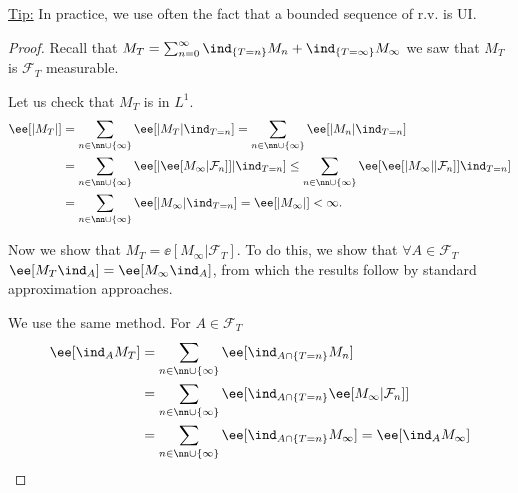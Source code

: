 \documentclass[../main.tex]{subfiles}
\begin{document}
\underline{Tip:} In practice, we use often the fact that a bounded sequence of
r.v. is UI.

\begin{proof}
    Recall that $M_T = \sum_{n = 0}^\infty \ind_{\{ T = n \}} M_n + \ind_{\{ T =
    \infty\} } M_{\infty}$ we saw that $M_T$ is $\mathcal{F}_T$ measurable. 

    Let us check that $M_T$ is in $L^1$.
    \begin{align*}
      \ee[|M_T|] &= \sum_{n \in \nn \cup \{ \infty \} } \ee[|M_T| \ind_{T = n}] 
               = \sum_{n \in \nn \cup \{ \infty \} } \ee[|M_n| \ind_{T = n}] \\
               &= \sum_{n \in \nn \cup \{ \infty \} } \ee[|\ee[M_{\infty} |
               \mathcal{F}_n]]| \ind_{T = n}] 
               \leq \sum_{n \in \nn \cup \{ \infty \} } \ee[\ee[|M_{\infty}| |
               \mathcal{F}_n]] \ind_{T = n}] \\
               &= \sum_{n \in \nn \cup \{ \infty \} } \ee[|M_{\infty}| \ind_{T = n}]
               = \ee[|M_{\infty}|] < \infty.
    \end{align*}

    Now we show that $M_T = \ee[M_{\infty} | \mathcal{F}_T]$. To do this, we
    show that $\forall A \in \mathcal{F}_T$ $\ee[M_T \ind_{A}] = \ee[M_{\infty}
    \ind_{A}] $, from which the results follow by standard approximation
    approaches.

    We use the same method. For $A \in \mathcal{F}_T$
    \begin{align*}
      \ee[\ind_A M_T] &= \sum_{n \in \nn \cup \{ \infty \} } \ee[\ind_{A \cap
      \{ T = n \} } M_n] \\
      &= \sum_{n \in \nn \cup \{ \infty \} } \ee[\ind_{A \cap
      \{ T = n \} } \ee[M_{\infty} | \mathcal{F}_n]] \\
      &= \sum_{n \in \nn \cup \{ \infty \} } \ee[\ind_{A \cap
      \{ T = n \} } M_{\infty}] = \ee[\ind_A M_{\infty}] 
    \end{align*}
\end{proof}
\end{document}
